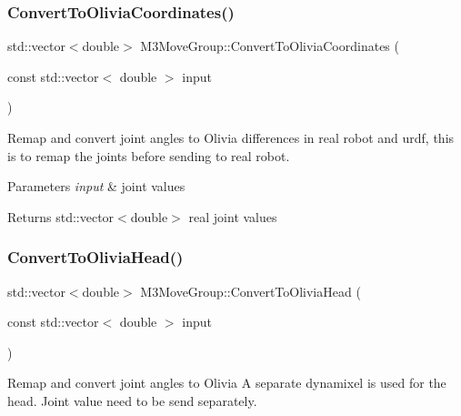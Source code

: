 \subsubsection{\texorpdfstring{Convert\+To\+Olivia\+Coordinates()}{ConvertToOliviaCoordinates()}\hspace{0.1cm}{\footnotesize\ttfamily [2/2]}}
{\footnotesize\ttfamily std\+::vector$<$double$>$ M3\+Move\+Group\+::\+Convert\+To\+Olivia\+Coordinates (\begin{DoxyParamCaption}\item[{const std\+::vector$<$ double $>$}]{input }\end{DoxyParamCaption})\hspace{0.3cm}{\ttfamily [inline]}}



Remap and convert joint angles to Olivia differences in real robot and urdf, this is to remap the joints before sending to real robot. 


\begin{DoxyParams}{Parameters}
{\em input} & joint values \\
\hline
\end{DoxyParams}
\begin{DoxyReturn}{Returns}
std\+::vector$<$double$>$ real joint values 
\end{DoxyReturn}
\mbox{\label{classM3MoveGroup_a59d8555d6560673417be20d6bf5d6aae}} 
\subsubsection{\texorpdfstring{Convert\+To\+Olivia\+Head()}{ConvertToOliviaHead()}\hspace{0.1cm}{\footnotesize\ttfamily [1/2]}}
{\footnotesize\ttfamily std\+::vector$<$double$>$ M3\+Move\+Group\+::\+Convert\+To\+Olivia\+Head (\begin{DoxyParamCaption}\item[{const std\+::vector$<$ double $>$}]{input }\end{DoxyParamCaption})\hspace{0.3cm}{\ttfamily [inline]}}



Remap and convert joint angles to Olivia A separate dynamixel is used for the head. Joint value need to be send separately. 


